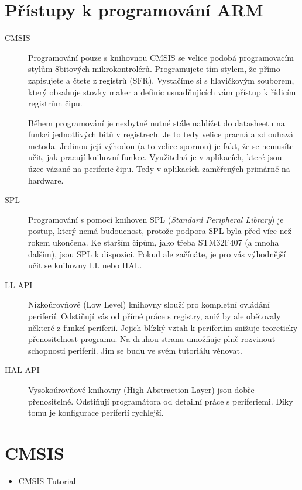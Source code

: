 \section{Přístupy k programování ARM}
\begin{description}
  \item[CMSIS] Programování pouze s knihovnou CMSIS se velice podobá programovacím stylům 
    8bitových mikrokontrolérů. Programujete tím stylem, že přímo zapisujete a čtete z registrů 
    (SFR). Vystačíme si s hlavičkovým souborem, který obsahuje stovky maker a definic    
    usnadňujících vám přístup k řídicím registrům čipu.
  
    Během programování je nezbytně nutné stále nahlížet do datasheetu na funkci jednotlivých bitů v 
    registrech. Je to tedy velice pracná a zdlouhavá metoda. Jedinou její výhodou (a to velice 
    spornou) je fakt, že se nemusíte učit, jak pracují knihovní funkce. Využitelná je v aplikacích, 
    které jsou úzce vázané na periferie čipu. Tedy v aplikacích zaměřených primárně na hardware.
  \item[SPL] Programování s pomocí knihoven SPL (\emph{Standard Peripheral Library}) je postup, 
    který nemá budoucnost, protože podpora SPL byla před více než rokem ukončena. Ke starším čipům, 
    jako třeba STM32F407 (a mnoha dalším), jsou SPL k dispozici. Pokud ale začínáte, je pro vás 
    výhodnější učit se knihovny LL nebo HAL.
  \item [LL API] Nízkoúrovňové (Low Level) knihovny slouží pro kompletní ovládání periferií. 
    Odstiňují vás od přímé práce s registry, aniž by ale obětovaly některé z funkcí periferií. 
    Jejich blízký vztah k periferiím snižuje teoreticky přenositelnost programu. Na druhou stranu 
    umožňuje plně rozvinout schopnosti periferií. Jim se budu ve svém tutoriálu věnovat.
  \item [HAL API] Vysokoúrovňové knihovny (High Abstraction Layer) jsou dobře přenositelné. 
    Odstiňují programátora od detailní práce s periferiemi. Díky tomu je konfigurace periferií 
    rychlejší. 
\end{description}


\section{CMSIS}
  \begin{itemize}
    \item \href{http://librarian/stable.php?id=141}{CMSIS Tutorial}
  \end{itemize}
  
\printbibliography[title={Seznam literatury}, heading=subbibliography]
